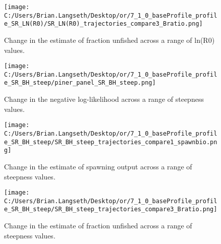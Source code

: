 \documentclass[11pt,
  english,
  a4paper,
]{article}
\begin{document}
\begin{figure}
\centering
\texttt{[image: C:/Users/Brian.Langseth/Desktop/or/7\_1\_0\_baseProfile\_profile\_SR\_LN(R0)/SR\_LN(R0)\_trajectories\_compare3\_Bratio.png]}
\caption{Change in the estimate of fraction unfished across a range of ln(R0) values.\label{fig:r0-depl}}
\end{figure}

\tagmcend\tagstructend


\begin{figure}
\centering
\texttt{[image: C:/Users/Brian.Langseth/Desktop/or/7\_1\_0\_baseProfile\_profile\_SR\_BH\_steep/piner\_panel\_SR\_BH\_steep.png]}
\caption{Change in the negative log-likelihood across a range of steepness values.\label{fig:h-profile}}
\end{figure}

\tagmcend\tagstructend


\begin{figure}
\centering
\texttt{[image: C:/Users/Brian.Langseth/Desktop/or/7\_1\_0\_baseProfile\_profile\_SR\_BH\_steep/SR\_BH\_steep\_trajectories\_compare1\_spawnbio.png]}
\caption{Change in the estimate of spawning output across a range of steepness values.\label{fig:h-ssb}}
\end{figure}

\tagmcend\tagstructend


\begin{figure}
\centering
\texttt{[image: C:/Users/Brian.Langseth/Desktop/or/7\_1\_0\_baseProfile\_profile\_SR\_BH\_steep/SR\_BH\_steep\_trajectories\_compare3\_Bratio.png]}
\caption{Change in the estimate of fraction unfished across a range of steepness values.\label{fig:h-depl}}
\end{figure}

\tagmcend\tagstructend

\end{document}
